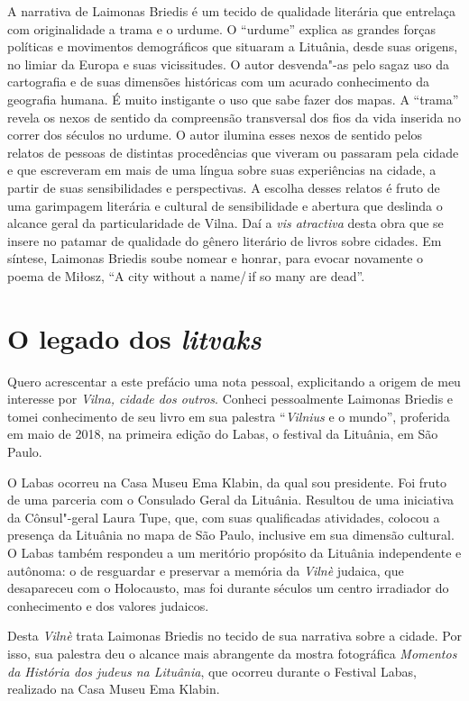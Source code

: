 A narrativa de Laimonas Briedis é um tecido de qualidade literária que
entrelaça com originalidade a trama e o urdume. O ``urdume'' explica as
grandes forças políticas e movimentos demográficos que situaram a
Lituânia, desde suas origens, no limiar da Europa e suas vicissitudes. O
autor desvenda"-as pelo sagaz uso da cartografia e de suas dimensões
históricas com um acurado conhecimento da geografia humana. É muito
instigante o uso que sabe fazer dos mapas. A ``trama'' revela os nexos de
sentido da compreensão transversal dos fios da vida inserida no correr
dos séculos no urdume. O autor ilumina esses nexos de sentido pelos
relatos de pessoas de distintas procedências que viveram ou passaram
pela cidade e que escreveram em mais de uma língua sobre suas
experiências na cidade, a partir de suas sensibilidades e perspectivas.
A escolha desses relatos é fruto de uma garimpagem literária e cultural
de sensibilidade e abertura que deslinda o alcance geral da
particularidade de Vilna. Daí a \textit{vis atractiva} desta obra que se
insere no patamar de qualidade do gênero literário de livros sobre
cidades. Em síntese, Laimonas Briedis soube nomear e honrar, para evocar
novamente o poema de Miłosz, ``A city without a name/\,if so many are
dead''.

\section*{O legado dos \textit{litvaks}}

Quero acrescentar a este prefácio uma nota pessoal, explicitando a
origem de meu interesse por \textit{Vilna, cidade dos outros}. Conheci
pessoalmente Laimonas Briedis e tomei conhecimento de seu livro em sua
palestra ``\textit{Vilnius} e o mundo'', proferida em maio de 2018, na primeira
edição do Labas, o festival da Lituânia, em São Paulo.

O Labas ocorreu na Casa Museu Ema Klabin, da qual sou
presidente. Foi fruto de uma parceria com o Consulado Geral da Lituânia.
Resultou de uma iniciativa da Cônsul"-geral Laura Tupe, que, com suas
qualificadas atividades, colocou a presença da Lituânia no mapa de São
Paulo, inclusive em sua dimensão cultural. O Labas também respondeu a um
meritório propósito da Lituânia independente e autônoma: o de resguardar
e preservar a memória da \textit{Vilnè} judaica, que desapareceu com o
Holocausto, mas foi durante séculos um centro irradiador do conhecimento
e dos valores judaicos.

Desta \textit{Vilnè} trata Laimonas Briedis no tecido de sua narrativa sobre a
cidade. Por isso, sua palestra deu o alcance mais abrangente da mostra
fotográfica \textit{Momentos da História dos judeus na Lituânia}, que
ocorreu durante o Festival Labas, realizado na Casa Museu Ema Klabin.

